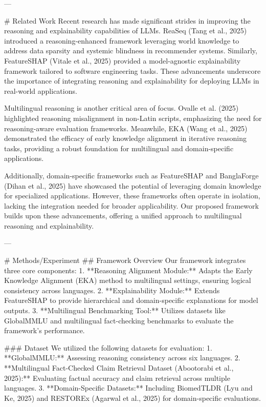 ---

# Related Work  
Recent research has made significant strides in improving the reasoning and explainability capabilities of LLMs. ReaSeq (Tang et al., 2025) introduced a reasoning-enhanced framework leveraging world knowledge to address data sparsity and systemic blindness in recommender systems. Similarly, FeatureSHAP (Vitale et al., 2025) provided a model-agnostic explainability framework tailored to software engineering tasks. These advancements underscore the importance of integrating reasoning and explainability for deploying LLMs in real-world applications.

Multilingual reasoning is another critical area of focus. Ovalle et al. (2025) highlighted reasoning misalignment in non-Latin scripts, emphasizing the need for reasoning-aware evaluation frameworks. Meanwhile, EKA (Wang et al., 2025) demonstrated the efficacy of early knowledge alignment in iterative reasoning tasks, providing a robust foundation for multilingual and domain-specific applications.

Additionally, domain-specific frameworks such as FeatureSHAP and BanglaForge (Dihan et al., 2025) have showcased the potential of leveraging domain knowledge for specialized applications. However, these frameworks often operate in isolation, lacking the integration needed for broader applicability. Our proposed framework builds upon these advancements, offering a unified approach to multilingual reasoning and explainability.

---

# Methods/Experiment  
## Framework Overview  
Our framework integrates three core components:  
1. **Reasoning Alignment Module:** Adapts the Early Knowledge Alignment (EKA) method to multilingual settings, ensuring logical consistency across languages.  
2. **Explainability Module:** Extends FeatureSHAP to provide hierarchical and domain-specific explanations for model outputs.  
3. **Multilingual Benchmarking Tool:** Utilizes datasets like GlobalMMLU and multilingual fact-checking benchmarks to evaluate the framework's performance.

### Dataset  
We utilized the following datasets for evaluation:  
1. **GlobalMMLU:** Assessing reasoning consistency across six languages.  
2. **Multilingual Fact-Checked Claim Retrieval Dataset (Abootorabi et al., 2025):** Evaluating factual accuracy and claim retrieval across multiple languages.  
3. **Domain-Specific Datasets:** Including BiomedTLDR (Lyu and Ke, 2025) and RESTOREx (Agarwal et al., 2025) for domain-specific evaluations.

